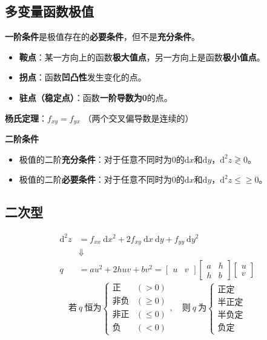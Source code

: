 \documentclass[12pt, a4paper, oneside]{article}
\begin{document}
\begin{CJK*}{UTF8}{gbsn}
%
\subsection{多变量函数极值}
\noindent
\textbf{一阶条件}是极值存在的\textbf{必要条件}，但不是\textbf{充分条件}。
\begin{itemize}
	\item \textbf{鞍点}：某一方向上的函数\textbf{极大值点}，另一方向上是函数\textbf{极小值点}。
	\item \textbf{拐点}：函数\textbf{凹凸性}发生变化的点。
	\item \textbf{驻点（稳定点）}：函数\textbf{一阶导数为0}的点。
\end{itemize}

\textbf{杨氏定理}：$f_{x y}=f_{y x}$ （两个交叉偏导数是连续的）
\newline

\noindent
\textbf{二阶条件}
\begin{itemize}
	\item 极值的二阶\textbf{充分条件}：对于任意不同时为0的$\mathrm{d}x$和$\mathrm{d}y$，$\mathrm{d}^2z \gtrless 0$。
	\item 极值的二阶\textbf{必要条件}：对于任意不同时为0的$\mathrm{d}x$和$\mathrm{d}y$，$\mathrm{d}^2z \leq\geq 0$。
\end{itemize}

%
\subsection{二次型}
$$
\begin{aligned}
	\mathrm{d}^{2} z 
	& = f_{x x} \mathrm{~d} x^{2}+2 f_{x y} \mathrm{~d} x \mathrm{~d} y+f_{y y} \mathrm{~d} y^{2}
	\\
	& \Downarrow
	\\
	q &
	= a u^{2}+2 h u v+b v^{2} 
	= 
	 \left[
		 \begin{array}{cc}u & v\end{array}
	 \right]
	 \left[
		 \begin{array}{cc}a & h \\ h & b\end{array}
	 \right]
	 \left[
		 \begin{array}{c}u \\ v\end{array}
	 \right]
\end{aligned}
$$
$$
\text{若}\ q \ \text{恒为}
\left\{
	\begin{array}{ll}
		\text{正} & (>0) \\
		\text{非负} & (\geqslant 0) \\
		\text{非正} & (\leqslant 0) \\
		\text{负} & (<0)
	\end{array}
\right.,
\quad
\text{则}\ q \ \text{为} 
\left\{
	\begin{array}{l}
		\text{正定} \\
		\text{半正定} \\
		\text{半负定} \\ 
		\text{负定}
	\end{array}
\right.
$$


\end{CJK*}
\end{document}
